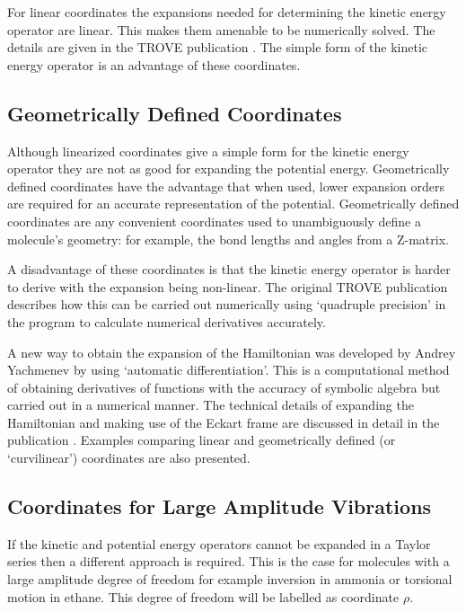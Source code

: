 For linear coordinates the expansions needed for determining the kinetic energy operator are linear. This makes them 
amenable to be numerically solved. The details are given in the TROVE publication \cite{TROVE}. 
The simple form of the kinetic energy operator is an advantage of these coordinates.

\subsection{Geometrically Defined Coordinates}
Although linearized coordinates give a simple form for the kinetic energy operator they are not as good for expanding the 
potential energy. Geometrically defined coordinates have the advantage that when used, lower expansion orders are required for
an accurate representation of the potential. Geometrically defined coordinates are any convenient coordinates used to 
unambiguously define a molecule's geometry: for example, the bond lengths and angles from a Z-matrix.

A disadvantage of these coordinates is that the kinetic energy operator is 
harder to derive with the expansion being non-linear. The original TROVE publication describes how this can be carried out
numerically using `quadruple precision' in the program to calculate numerical derivatives accurately. 

A new way to obtain the expansion of the Hamiltonian was developed by Andrey Yachmenev by using `automatic differentiation'.
This is a computational method of obtaining derivatives of functions with the accuracy of symbolic algebra but carried
out in a numerical manner. The technical details of expanding the Hamiltonian and making use of the Eckart frame are 
discussed in detail in the publication \cite{15YaYuxx.method}. 
Examples comparing linear and geometrically defined (or `curvilinear') coordinates are also presented.

 


\subsection{Coordinates for Large Amplitude Vibrations}

If the kinetic and potential energy operators cannot be expanded in a Taylor series then a different approach is required.
This is the case for molecules with a large amplitude degree of freedom for example inversion in ammonia or torsional motion
in ethane. This degree of freedom will be labelled as coordinate $\rho$.

